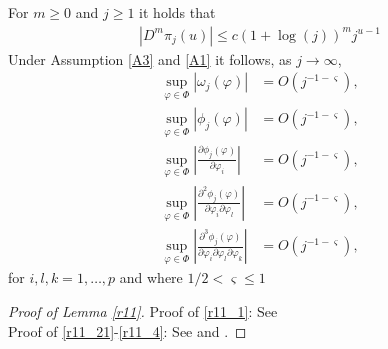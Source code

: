 {{\begin{lemma}\label{r11}
    For $m \geq 0$ and $j \geq 1$ it holds that 
    \begin{align}
        |D^m \pi_j(u)| \leq c (1+\log(j))^{m} j^{u-1} \label{r11_1}
    \end{align}
    Under Assumption \ref{A3} and \ref{A1} it follows, as $j \rightarrow \infty$,
    \begin{align}
    \underset{\varphi \in \Phi  }{\sup} \left| \omega_j(\varphi) \right|  &= O(j^{-1-\varsigma}), \label{r11_21}\\
     \underset{\varphi \in \Phi  }{\sup} \left| \phi_j(\varphi) \right|  &= O(j^{-1-\varsigma}), \label{r11_211}\\
     \underset{\varphi \in \Phi  }{\sup} \left| \frac{ \partial \phi_j(\varphi)}{\partial \varphi_i }\right|  &= O(j^{-1-\varsigma}),\label{r11_2} \\
    \underset{\varphi \in \Phi  }{\sup} \left| \frac{ \partial^2 \phi_j(\varphi)}{\partial \varphi_i \partial \varphi_l}\right|  &= O(j^{-1-\varsigma}),\label{r11_3} \\
    \underset{\varphi \in \Phi  }{\sup} \left| \frac{ \partial^3 \phi_j(\varphi)}{\partial \varphi_i \partial \varphi_l \partial \varphi_k}\right|  &= O(j^{-1-\varsigma}),\label{r11_4}
    \end{align}
for $i,l,k = 1,\ldots,p$ and where $1/2 < \varsigma  \leq 1$
\end{lemma}
\begin{proof}[Proof of Lemma \ref{r11}] Proof of \eqref{r11_1}:  See \textcite[Lemma A.3]{johansen2016role} \\
Proof of \eqref{r11_21}-\eqref{r11_4}: See \textcite[page 46]{zygmund1977trigonometric} and \textcite[page 3155 and page 3169]{hualde2011gaussian}.
\end{proof}

}}
